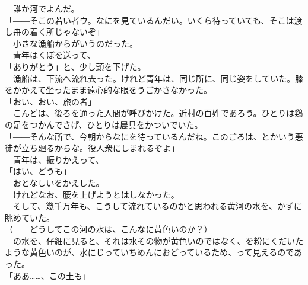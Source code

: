 \documentclass[
  paper=a5,
  fontsize=10pt,
  jafontsize=9.5pt,
  tate,                  %
  open_bracket_pos=nibu, %
]{jlreq}
\begin{document}
　誰か河でよんだ。\\


「――そこの若い者ウ。なにを見ているんだい。いくら待っていても、そこは渡し舟の着く所じゃないぞ」\\


　小さな漁船からがいうのだった。\\


　青年はくぼを送って、\\


「ありがとう」と、少し頭を下げた。\\


　漁船は、下流へ流れ去った。けれど青年は、同じ所に、同じ姿をしていた。膝をかかえて坐ったまま遠心的な眼をうごかさなかった。\\


「おい、おい、旅の者」\\


　こんどは、後ろを通った人間が呼びかけた。近村の百姓であろう。ひとりは鶏の足をつかんでさげ、ひとりは農具をかついでいた。\\


「――そんな所で、今朝からなにを待っているんだね。このごろは、とかいう悪徒が立ち廻るからな。役人衆にしまれるぞよ」\\


　青年は、振りかえって、\\


「はい、どうも」\\


　おとなしいをかえした。\\


　けれどなお、腰を上げようとはしなかった。\\


　そして、幾千万年も、こうして流れているのかと思われる黄河の水を、かずに眺めていた。\\


（――どうしてこの河の水は、こんなに黄色いのか？）\\


　の水を、仔細に見ると、それは水その物が黄色いのではなく、を粉にくだいたような黄色いのが、水にじっていちめんにおどっているため、って見えるのであった。\\


「ああ……、この土も」\\
\end{document}
